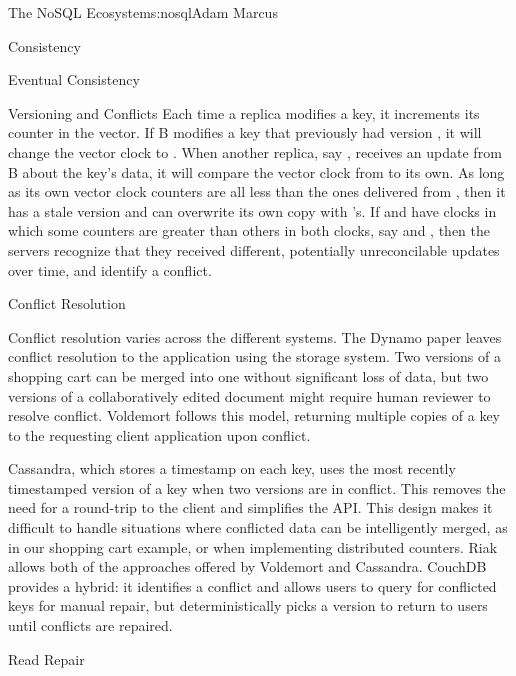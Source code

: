 \begin{aosachapter}{The NoSQL Ecosystem}{s:nosql}{Adam Marcus}
\begin{aosasect1}{Consistency}
\begin{aosasect2}{Eventual Consistency}
\begin{aosasect3}{Versioning and Conflicts}
Each time a replica modifies a key, it increments its counter in the
vector.  If B modifies a key that previously had version , it will change the vector clock to .  When
another replica, say , receives an update from B about the
key's data, it will compare the vector clock from  to its own.
As long as its own vector clock counters are all less than the ones
delivered from , then it has a stale version and can overwrite
its own copy with 's.  If  and  have clocks in
which some counters are greater than others in both clocks, say
 and , then the servers recognize
that they received different, potentially unreconcilable updates over
time, and identify a conflict.

\end{aosasect3}

\begin{aosasect3}{Conflict Resolution}

Conflict resolution varies across the different systems.  The Dynamo
paper leaves conflict resolution to the application using the
storage system.  Two versions of a shopping cart can be merged into
one without significant loss of data, but two versions of a
collaboratively edited document might require human reviewer to
resolve conflict.  Voldemort follows this model, returning multiple
copies of a key to the requesting client application upon conflict.

Cassandra, which stores a timestamp on each key, uses the most
recently timestamped version of a key when two versions are in
conflict.  This removes the need for a round-trip to the client and
simplifies the API. This design makes it difficult to handle
situations where conflicted data can be intelligently merged, as in
our shopping cart example, or when implementing distributed counters.
Riak allows both of the approaches offered by Voldemort and Cassandra.
CouchDB provides a hybrid: it identifies a conflict and allows users
to query for conflicted keys for manual repair, but deterministically
picks a version to return to users until conflicts are repaired.

\end{aosasect3}

\begin{aosasect3}{Read Repair}


\end{aosasect3}
\end{aosasect2}
\end{aosasect1}
\end{aosachapter}
